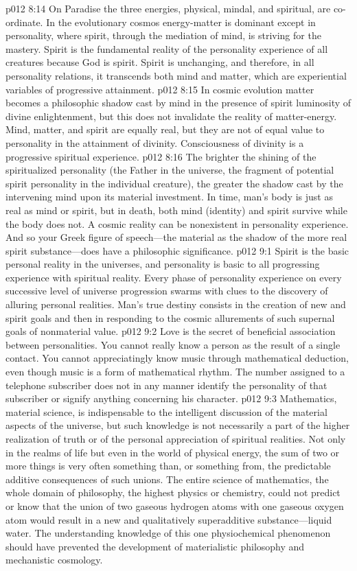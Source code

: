 \pc \vs p012 8:14 On Paradise the three energies, physical, mindal, and spiritual, are co\hyp{}ordinate. In the evolutionary cosmos energy\hyp{}matter is dominant except in personality, where spirit, through the mediation of mind, is striving for the mastery. Spirit is the fundamental reality of the personality experience of all creatures because God is spirit. Spirit is unchanging, and therefore, in all personality relations, it transcends both mind and matter, which are experiential variables of progressive attainment.
\vs p012 8:15 In cosmic evolution matter becomes a philosophic shadow cast by mind in the presence of spirit luminosity of divine enlightenment, but this does not invalidate the reality of matter\hyp{}energy. Mind, matter, and spirit are equally real, but they are not of equal value to personality in the attainment of divinity. Consciousness of divinity is a progressive spiritual experience.
\vs p012 8:16 The brighter the shining of the spiritualized personality (the Father in the universe, the fragment of potential spirit personality in the individual creature), the greater the shadow cast by the intervening mind upon its material investment. In time, man’s body is just as real as mind or spirit, but in death, both mind (identity) and spirit survive while the body does not. A cosmic reality can be nonexistent in personality experience. And so your Greek figure of speech---the material as the shadow of the more real spirit substance---does have a philosophic significance.
\vs p012 9:1 Spirit is the basic personal reality in the universes, and personality is basic to all progressing experience with spiritual reality. Every phase of personality experience on every successive level of universe progression swarms with clues to the discovery of alluring personal realities. Man’s true destiny consists in the creation of new and spirit goals and then in responding to the cosmic allurements of such supernal goals of nonmaterial value.
\pc \vs p012 9:2 Love is the secret of beneficial association between personalities. You cannot really know a person as the result of a single contact. You cannot appreciatingly know music through mathematical deduction, even though music is a form of mathematical rhythm. The number assigned to a telephone subscriber does not in any manner identify the personality of that subscriber or signify anything concerning his character.
\vs p012 9:3 Mathematics, material science, is indispensable to the intelligent discussion of the material aspects of the universe, but such knowledge is not necessarily a part of the higher realization of truth or of the personal appreciation of spiritual realities. Not only in the realms of life but even in the world of physical energy, the sum of two or more things is very often something  than, or something  from, the predictable additive consequences of such unions. The entire science of mathematics, the whole domain of philosophy, the highest physics or chemistry, could not predict or know that the union of two gaseous hydrogen atoms with one gaseous oxygen atom would result in a new and qualitatively superadditive substance---liquid water. The understanding knowledge of this one physiochemical phenomenon should have prevented the development of materialistic philosophy and mechanistic cosmology.
